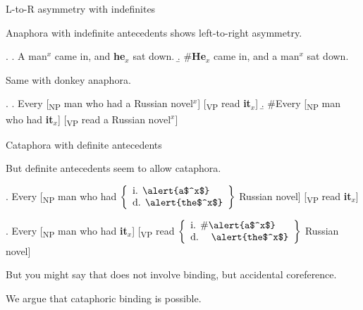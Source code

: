 \documentclass{beamer}
\begin{document}
\renewcommand{\Exlabelsep}{6pt}
\renewcommand{\SubExleftmargin}{18pt}



\begin{frame}{L-to-R asymmetry with indefinites}

Anaphora with indefinite antecedents shows left-to-right asymmetry.

\ex.
  \a. \alert{A man$^x$} came in, and \textbf{he$_x$} sat down.
  \b. \#\textbf{He$_x$} came in, and \alert{a man$^x$} sat down.

Same with donkey anaphora.

\ex.
  \a. Every [\textsubscript{NP} man who had \alert{a Russian novel$^x$}] [\textsubscript{VP} read \textbf{it$_x$}]
  \b. \#Every [\textsubscript{NP} man who had \textbf{it$_x$}] [\textsubscript{VP} read \alert{a Russian novel$^x$}]


\end{frame}

\begin{frame}{Cataphora with definite antecedents}

But definite antecedents seem to allow cataphora.

\ex.
  Every [\textsubscript{NP} man who had $\left\{\begin{array}{l}\text{i. \alert{a$^x$}}\\\text{d. \alert{the$^x$}}\end{array}\right\}$ \alert{Russian novel}] [\textsubscript{VP} read \textbf{it$_x$}]

\ex.
  Every [\textsubscript{NP} man who had \textbf{it$_x$}] [\textsubscript{VP} read $\left\{\begin{array}{l}\text{i. \#\alert{a$^x$}}\\\text{d. \phantom{\#}\alert{the$^x$}}\end{array}\right\}$ \alert{Russian novel}]


But you might say that \Last[d] does not involve binding, but \alert{accidental coreference}.

We argue that cataphoric binding is possible.



\end{frame}
\end{document}
